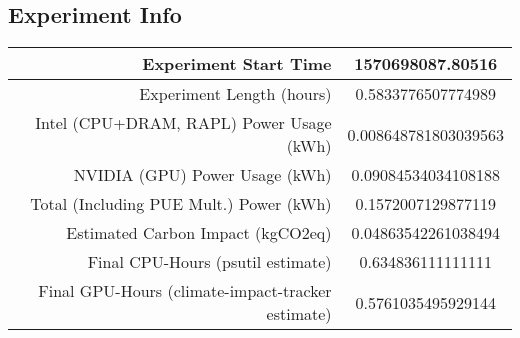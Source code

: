 \documentclass{article}%
\begin{document}
\subsection{Experiment Info}%
\label{subsec:Experiment Info}%
\begin{tabular}{|r|c|}%
\hline%
Experiment Start Time&1570698087.80516\\%
\hline%
Experiment Length (hours)&0.5833776507774989\\%
\hline%
Intel (CPU+DRAM, RAPL) Power Usage (kWh)&0.008648781803039563\\%
\hline%
NVIDIA (GPU) Power Usage (kWh)&0.09084534034108188\\%
\hline%
Total (Including PUE Mult.) Power (kWh)&0.1572007129877119\\%
\hline%
Estimated Carbon Impact (kgCO2eq)&0.04863542261038494\\%
\hline%
Final CPU{-}Hours (psutil estimate)&0.634836111111111\\%
\hline%
Final GPU{-}Hours (climate{-}impact{-}tracker estimate)&0.5761035495929144\\%
\hline%
\end{tabular}

%
\end{document}
